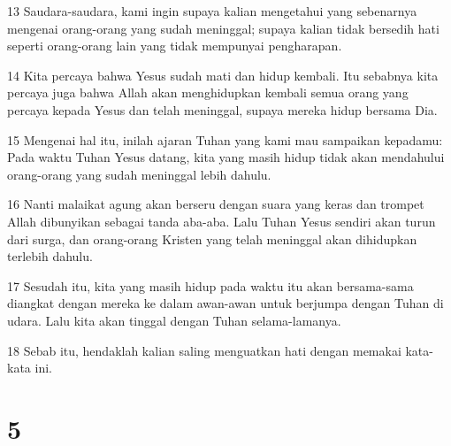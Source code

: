 \par 13 Saudara-saudara, kami ingin supaya kalian mengetahui yang sebenarnya mengenai orang-orang yang sudah meninggal; supaya kalian tidak bersedih hati seperti orang-orang lain yang tidak mempunyai pengharapan.
\par 14 Kita percaya bahwa Yesus sudah mati dan hidup kembali. Itu sebabnya kita percaya juga bahwa Allah akan menghidupkan kembali semua orang yang percaya kepada Yesus dan telah meninggal, supaya mereka hidup bersama Dia.
\par 15 Mengenai hal itu, inilah ajaran Tuhan yang kami mau sampaikan kepadamu: Pada waktu Tuhan Yesus datang, kita yang masih hidup tidak akan mendahului orang-orang yang sudah meninggal lebih dahulu.
\par 16 Nanti malaikat agung akan berseru dengan suara yang keras dan trompet Allah dibunyikan sebagai tanda aba-aba. Lalu Tuhan Yesus sendiri akan turun dari surga, dan orang-orang Kristen yang telah meninggal akan dihidupkan terlebih dahulu.
\par 17 Sesudah itu, kita yang masih hidup pada waktu itu akan bersama-sama diangkat dengan mereka ke dalam awan-awan untuk berjumpa dengan Tuhan di udara. Lalu kita akan tinggal dengan Tuhan selama-lamanya.
\par 18 Sebab itu, hendaklah kalian saling menguatkan hati dengan memakai kata-kata ini.

\chapter{5}

